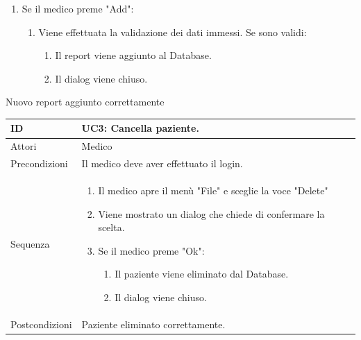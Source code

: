 \documentclass[a4paper, 11pt]{article}
\newcommand{\usecase}[5]{%
	\begin{table}[H]
		\centering
		\renewcommand{\familydefault}{\ttdefault}\normalfont
		\begin{tabular}{| >{\fontseries{b}\selectfont} p{0.3\textwidth} | L |}
			\hline
			ID&{#1}\\\hline
			Attori&{#2}\\\hline
			Precondizioni&{#3}\\\hline
			Sequenza&{#4}\\\hline
			Postcondizioni&{#5}\\\hline
		\end{tabular}
	\end{table}
	
}
\begin{document}
{\begin{enumerate}[label*=\arabic*., nosep]
\begin{enumerate}[label*=\arabic*., nosep]
\begin{enumerate}[label*=\arabic*., nosep]
\begin{enumerate}[label*=\arabic*., nosep]
\begin{enumerate}[label*=\arabic*., nosep]
								\item Il dialog viene chiuso.
							\end{enumerate}
						\end{enumerate}
					\end{enumerate}
					\item Se il medico preme "Add":
					\begin{enumerate}[label*=\arabic*., nosep]
						\item Viene effettuata la validazione dei dati immessi. Se sono validi:	
						\begin{enumerate}[label*=\arabic*., nosep]
							\item La terapia farmacologica viene aggiunta al Database.
							\item Il dialog viene chiuso.
						\end{enumerate}
					\end{enumerate}
				\end{enumerate}
				\item Se il medico preme "Add":				
				\begin{enumerate}[label*=\arabic*., nosep]
					\item Viene effettuata la validazione dei dati immessi. Se sono validi:	
					\begin{enumerate}[label*=\arabic*., nosep]
						\item Il report viene aggiunto al Database.
						\item Il dialog viene chiuso.
					\end{enumerate}
				\end{enumerate}
			\end{enumerate}
		}
		{Nuovo report aggiunto correttamente}
		
		\usecase{UC3: Cancella paziente.}
		{Medico}
		{Il medico deve aver effettuato il login.}
		{%
			\begin{enumerate}[label*=\arabic*., nosep]
				\item Il medico apre il menù "File" e sceglie la voce "Delete"
				\item Viene mostrato un dialog che chiede di confermare la scelta.
				\item Se il medico preme "Ok":
				\begin{enumerate}[label*=\arabic*., nosep]
					\item Il paziente viene eliminato dal Database.
					\item Il dialog viene chiuso.
				\end{enumerate}					
			\end{enumerate}
		}
		{Paziente eliminato correttamente.}
		
\end{document}
